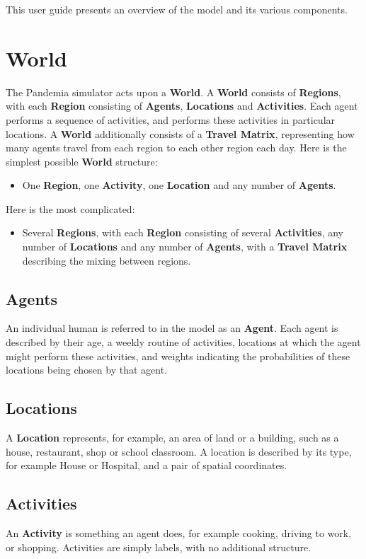 \documentclass[10pt,letterpaper]{article}
\begin{document}
This user guide presents an overview of the model and its various components.

\section{World}

The Pandemia simulator acts upon a \textbf{World}. A \textbf{World} consists of \textbf{Regions}, with each \textbf{Region} consisting of \textbf{Agents}, \textbf{Locations} and \textbf{Activities}. Each agent performs a sequence of activities, and performs these activities in particular locations. A \textbf{World} additionally consists of a \textbf{Travel Matrix}, representing how many agents travel from each region to each other region each day. Here is the simplest possible \textbf{World} structure:
\begin{itemize}
\item One \textbf{Region}, one \textbf{Activity}, one \textbf{Location} and any number of \textbf{Agents}.
\end{itemize}
Here is the most complicated:
\begin{itemize}
\item Several \textbf{Regions}, with each \textbf{Region} consisting of several \textbf{Activities}, any number of \textbf{Locations} and any number of \textbf{Agents}, with a \textbf{Travel Matrix} describing the mixing between regions.
\end{itemize}

\subsection{Agents}
An individual human is referred to in the model as an \textbf{Agent}. Each agent is described by their age, a weekly routine of activities, locations at which the agent might perform these activities, and weights indicating the probabilities of these locations being chosen by that agent.

\subsection{Locations}
A \textbf{Location} represents, for example, an area of land or a building, such as a house, restaurant, shop or school classroom. A location is described by its type, for example House or Hospital, and a pair of spatial coordinates.

\subsection{Activities}
An \textbf{Activity} is something an agent does, for example cooking, driving to work, or shopping. Activities are simply labels, with no additional structure.
\end{document}
